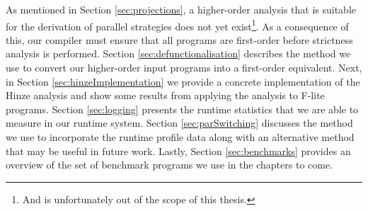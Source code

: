 As mentioned in Section \ref{sec:projections}, a higher-order analysis that is
suitable for the derivation of parallel strategies does not yet exist\footnote{
And is unfortunately out of the scope of this thesis.}. As a consequence of
this, our compiler must ensure that all programs are first-order before
strictness analysis is performed. Section \ref{sec:defunctionalisation}
describes the method we use to convert our higher-order input programs into a
first-order equivalent. Next, in Section \ref{sec:hinzeImplementation} we
provide a concrete implementation of the Hinze analysis and show some results
from applying the analysis to F-lite programs. Section \ref{sec:logging}
presents the runtime statistics that we are able to measure in our runtime
system. Section \ref{sec:parSwitching} discusses the method we use to
incorporate the runtime profile data along with an alternative method that may
be useful in future work. Lastly, Section \ref{sec:benchmarks} provides an
overview of the set of benchmark programs we use in the chapters to come.

